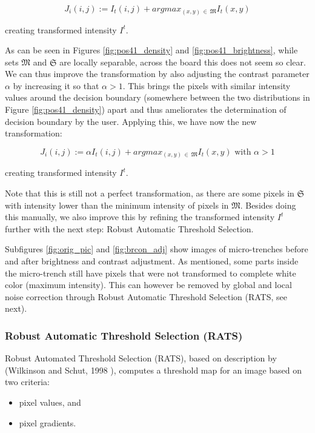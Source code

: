 \documentclass[pdftex,12pt,a4paper]{report}
\begin{document}
$$
J_i(i, j) := I_t(i, j) + argmax_{(x, y) \, \in \, \mathfrak{M}}{I_t(x, y)}
$$

creating transformed intensity $I^t$.

As can be seen in Figures \ref{fig:pos41_density} and \ref {fig:pos41_brightness}, while sets $\mathfrak{M}$ and $\mathfrak{S}$ are locally separable, across the board this does not seem so clear. We can thus improve the transformation by also adjusting the contrast parameter $\alpha$ by increasing it so that $\alpha > 1$. This brings the pixels with similar intensity values around the decision boundary (somewhere between the two distributions in Figure \ref{fig:pos41_density}) apart and thus ameliorates the determination of decision boundary by the user. Applying this, we have now the new transformation:

$$
J_i(i, j) := \alpha I_t(i, j) + argmax_{(x, y) \, \in \, \mathfrak{M}}{I_t(x, y)} \text{ with } \alpha > 1
$$

creating transformed intensity $I^t$.

Note that this is still not a perfect transformation, as there are some pixels in $\mathfrak{S}$ with intensity lower than the minimum intensity of pixels in $\mathfrak{M}$. Besides doing this manually, we also improve this by refining the transformed intensity $I^t$ further with the next step: Robust Automatic Threshold Selection.

Subfigures \ref{fig:orig_pic} and \ref{fig:brcon_adj} show images of micro-trenches before and after brightness and contrast adjustment. As mentioned, some parts inside the micro-trench still have pixels  that were not transformed to complete white color (maximum intensity). This can however be removed by global and local noise correction through Robust Automatic Threshold Selection (RATS, see next).

\subsubsection*{Robust Automatic Threshold Selection (RATS)}
\label{subsubsection:rats}

Robust Automated Threshold Selection (RATS), based on description by (Wilkinson and Schut, 1998 \cite{wilkinson1998digital}), computes a threshold map for an image based on two criteria:

\begin{itemize}
\item pixel values, and
\item pixel gradients. \cite{fiji2017rats}
\end{itemize}
\end{document}

